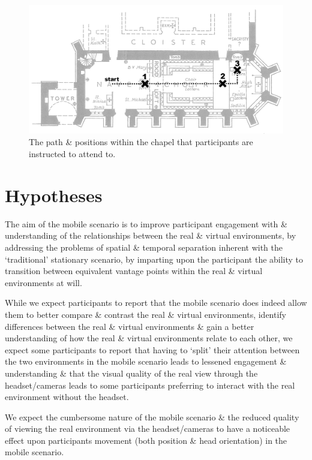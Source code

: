 \documentclass[oneside]{book}
\begin{document}
\begin{figure}[h]
	\begin{center}
		\includegraphics[width=\linewidth]{images/chapel_path.png}
		\caption{The path \& positions within the chapel that participants are instructed to attend to.}
		\label{chapel_path}
	\end{center}
\end{figure}

\section{Hypotheses}
The aim of the mobile scenario is to improve participant engagement with \& understanding of the relationships between the real \& virtual environments, by addressing the problems of spatial \& temporal separation inherent with the `traditional' stationary scenario, by imparting upon the participant the ability to transition between equivalent vantage points within the real \& virtual environments at will.

While we expect participants to report that the mobile scenario does indeed allow them to better compare \& contrast the real \& virtual environments, identify differences between the real \& virtual environments \& gain a better understanding of how the real \& virtual environments relate to each other, we expect some participants to report that having to `split' their attention between the two environments in the mobile scenario leads to lessened engagement \& understanding \& that the visual quality of the real view through the headset/cameras leads to some participants preferring to interact with the real environment without the headset.

We expect the cumbersome nature of the mobile scenario \& the reduced quality of viewing the real environment via the headset/cameras to have a noticeable effect upon participants movement (both position \& head orientation) in the mobile scenario.
\end{document}
